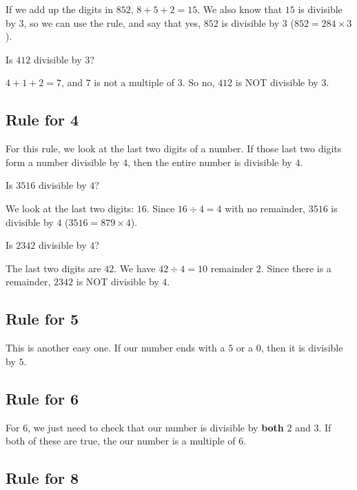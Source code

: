 \documentclass{article}
\theoremstyle{mytheoremstyle}
\theoremstyle{mytheoremstyle}
\theoremstyle{myproblemstyle}
\theoremstyle{myproblemstyle}
\begin{document}
        If we add up the digits in $852$, $8 + 5 + 2 = 15$. We also know that $15$ is divisible by $3$, so we can use the rule, and say that yes, $852$ is divisible by $3$ ($852 = 284 \times 3$).

        \begin{example}
            Is $412$ divisible by $3$?
        \end{example}

        $4 + 1 + 2 = 7$, and $7$ is not a multiple of $3$. So no, $412$ is NOT divisible by $3$.
        
        \subsection{Rule for 4}

        For this rule, we look at the last two digits of a number. If those last two digits form a number divisible by $4$, then the entire number is divisible by $4$.

        \begin{example}
            Is $3516$ divisible by $4$?
        \end{example}

        We look at the last two digits: $16$. Since $16 \div 4 = 4$ with no remainder, $3516$ is divisible by $4$ ($3516 = 879 \times 4$).

        \begin{example}
            Is $2342$ divisible by $4$?
        \end{example}

        The last two digits are $42$. We have $42 \div 4 = 10$ remainder $2$. Since there is a remainder, $2342$ is NOT divisible by $4$.

        \subsection{Rule for 5}
        This is another easy one. If our number ends with a $5$ or a $0$, then it is divisible by $5$.

        \subsection{Rule for 6}
        For $6$, we just need to check that our number is divisible by \textbf{both} $2$ and $3$. If both of these are true, the our number is a multiple of $6$.

        \subsection{Rule for 8}
\end{document}
